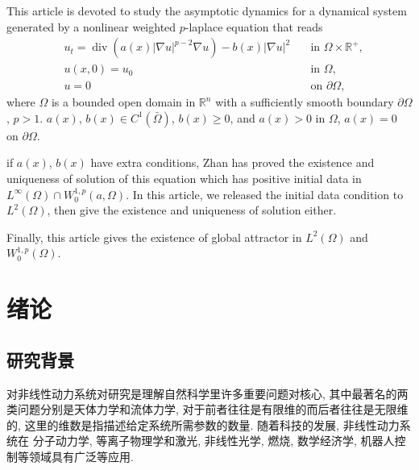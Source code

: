 \documentclass[twoside,longtitle]{LZUthesis}
\theoremstyle{definition}
\numberwithin{equation}{chapter}
\newcommand*\abs[1]{\lvert#1\rvert}
\newcommand\R{\mathbb{R}}
\DeclareMathOperator{\Div}{div}
\begin{document}

\begin{englishabstract}
	This article is devoted to study the asymptotic dynamics for a dynamical system generated by a nonlinear
	weighted $p$-laplace equation that reads
	\begin{equation}\label{eq:main}
		\begin{alignedat}{2}
			& u_t = \Div(a(x)\abs{\nabla u}^{p-2}\nabla u) - b(x)\abs{\nabla u}^2 \quad &\text{in } \Omega \times \R^+,\\
			& u(x,0) = u_0 \quad &\text{in } \Omega,\\
			& u = 0 \quad &\text{on } \partial\Omega,
		\end{alignedat}
	\end{equation}
	where $\Omega$ is a bounded open domain in $\R^{n}$ with a sufficiently smooth boundary $\partial\Omega$, $p>1$.
	$ a(x)$, $b(x) \in C^1(\bar{\Omega}) $, $b(x) \geq 0$, and $a(x) > 0$ in $\Omega$, $a(x) = 0$ on $\partial\Omega$.

	if $a(x)$, $b(x)$ have extra conditions, Zhan has proved the existence and uniqueness of solution of this equation
	which has positive initial data in $L^{\infty}(\Omega) \cap W_0^{1,p}(a,\Omega)$. In this article, we released the
	initial data condition to $L^2(\Omega)$, then give the existence and uniqueness of solution either.

	Finally, this article gives the existence of global attractor in $L^2(\Omega)$ and $W_0^{1,p}(\Omega)$.
\end{englishabstract}


\tableofcontents{}


\mainmatter

\pagestyle{lzu}


\chapter{绪论}
\section{研究背景}
对非线性动力系统对研究是理解自然科学里许多重要问题对核心,
其中最著名的两类问题分别是天体力学和流体力学,
对于前者往往是有限维的而后者往往是无限维的,
这里的维数是指描述给定系统所需参数的数量.
随着科技的发展, 非线性动力系统在
分子动力学, 等离子物理学和激光, 非线性光学, 燃烧, 数学经济学, 机器人控制等领域具有广泛等应用.
\end{document}
